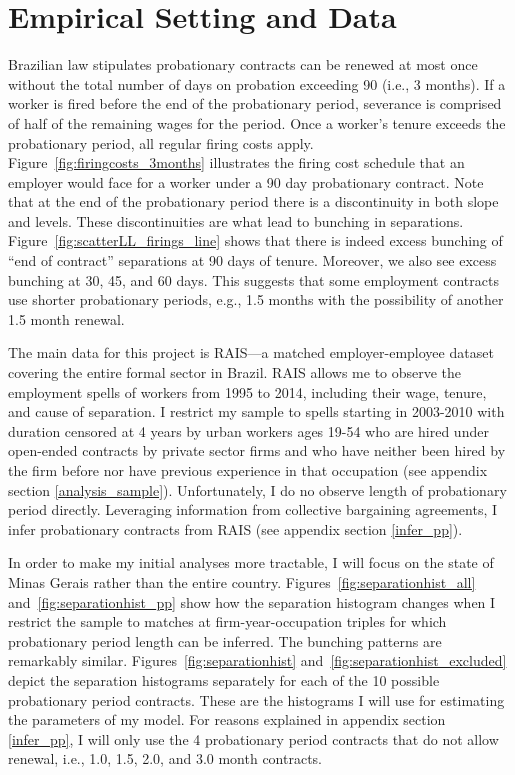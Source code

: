 \documentclass[12pt]{article}
\begin{document}
\section{Empirical Setting and Data}

Brazilian law stipulates probationary contracts can be renewed at most once without the total number of days on probation exceeding 90 (i.e., 3 months).
If a worker is fired before the end of the probationary period, severance is comprised of half of the remaining wages for the period.
Once a worker's tenure exceeds the probationary period, all regular firing costs apply.
Figure~\ref{fig:firingcosts_3months} illustrates the firing cost schedule that an employer would face for a worker under a 90 day probationary contract. 
Note that at the end of the probationary period there is a discontinuity in both slope and levels. 
These discontinuities are what lead to bunching in separations.
Figure~\ref{fig:scatterLL_firings_line} shows that there is indeed excess bunching of ``end of contract'' separations at 90 days of tenure. 
Moreover, we also see excess bunching at 30, 45, and 60 days. 
This suggests that some employment contracts use shorter probationary periods, e.g., 1.5 months with the possibility of another 1.5 month renewal.

The main data for this project is RAIS---a matched employer-employee dataset covering the entire formal sector in Brazil.
RAIS allows me to observe the employment spells of workers from 1995 to 2014, including their wage, tenure, and cause of separation.
I restrict my sample to spells starting in 2003-2010 with duration censored at 4 years by urban workers ages 19-54 who are hired under open-ended contracts by private sector firms and who have neither been hired by the firm before nor have previous experience in that occupation (see appendix section \ref{analysis_sample}).
Unfortunately, I do no observe length of probationary period directly.
Leveraging information from collective bargaining agreements, I infer probationary contracts from RAIS (see appendix section \ref{infer_pp}).

In order to make my initial analyses more tractable, I will focus on the state of Minas Gerais rather than the entire country. 
Figures~\ref{fig:separationhist_all} and~\ref{fig:separationhist_pp} show how the separation histogram changes when I restrict the sample to matches at firm-year-occupation triples for which probationary period length can be inferred.
The bunching patterns are remarkably similar. 
Figures~\ref{fig:separationhist} and~\ref{fig:separationhist_excluded} depict the separation histograms separately for each of the 10 possible probationary period contracts.
These are the histograms I will use for estimating the parameters of my model.
For reasons explained in appendix section \ref{infer_pp}, I will only use the 4 probationary period contracts that do not allow renewal, i.e., 1.0, 1.5, 2.0, and 3.0 month contracts.
\end{document}
